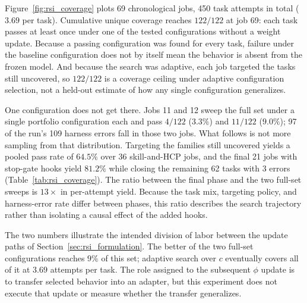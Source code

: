 Figure~\ref{fig:rsi_coverage} plots 69 chronological jobs, 450 task attempts in total ($3.69$ per task). Cumulative unique coverage reaches $122/122$ at job 69: each task passes at least once under one of the tested configurations without a weight update. Because a passing configuration was found for every task, failure under the baseline configuration does not by itself mean the behavior is absent from the frozen model. And because the search was adaptive, each job targeted the tasks still uncovered, so $122/122$ is a coverage ceiling under adaptive configuration selection, not a held-out estimate of how any single configuration generalizes.

One configuration does not get there. Jobs 11 and 12 sweep the full set under a single portfolio configuration each and pass $4/122$ ($3.3\%$) and $11/122$ ($9.0\%$); 97 of the run's 109 harness errors fall in those two jobs. What follows is not more sampling from that distribution. Targeting the families still uncovered yields a pooled pass rate of $64.5\%$ over 36 skill-and-HCP jobs, and the final 21 jobs with stop-gate hooks yield $81.2\%$ while closing the remaining 62 tasks with 3 errors (Table~\ref{tab:rsi_coverage}). The ratio between the final phase and the two full-set sweeps is $13\times$ in per-attempt yield. Because the task mix, targeting policy, and harness-error rate differ between phases, this ratio describes the search trajectory rather than isolating a causal effect of the added hooks.

The two numbers illustrate the intended division of labor between the update paths of Section~\ref{sec:rsi_formulation}. The better of the two full-set configurations reaches $9\%$ of this set; adaptive search over $c$ eventually covers all of it at $3.69$ attempts per task. The role assigned to the subsequent $\phi$ update is to transfer selected behavior into an adapter, but this experiment does not execute that update or measure whether the transfer generalizes.



\FloatBarrier
